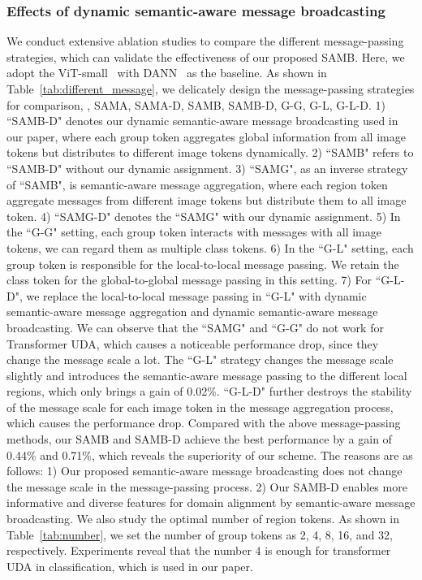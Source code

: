 \documentclass[journal]{IEEEtran}
\begin{document}
\subsubsection{Effects of dynamic semantic-aware message broadcasting}
\label{sec:ab_ms}
We conduct extensive ablation studies to compare the different message-passing strategies, which can validate the effectiveness of our proposed SAMB. Here, we adopt the ViT-small~\cite{dosovitskiy2020imageViT} with DANN~\cite{ganin2016domain_dann} as the baseline. As shown in Table~\ref{tab:different_message}, we
delicately design the  message-passing strategies for comparison, \ieno, SAMA, SAMA-D, SAMB, SAMB-D, G-G, G-L, G-L-D. 1) ``SAMB-D" denotes our dynamic semantic-aware message broadcasting used in our paper, where each group token aggregates global information from all image tokens but distributes to different image tokens dynamically. 2) ``SAMB" refers to ``SAMB-D" without our dynamic assignment. 3) ``SAMG", as an inverse strategy of ``SAMB", is semantic-aware message aggregation, where each region token aggregate messages from different image tokens but distribute them to all image token. 4) ``SAMG-D" denotes the ``SAMG" with our dynamic assignment. 
5) In the ``G-G" setting, each group token interacts with messages with all image tokens, we can regard them as multiple class tokens. 6) In the ``G-L" setting, each group token is responsible for the local-to-local message passing. We retain the class token for the global-to-global message passing in this setting. 7) For ``G-L-D", we replace the local-to-local message passing in ``G-L" with dynamic semantic-aware message aggregation and dynamic semantic-aware message broadcasting. 
We can observe that the ``SAMG" and  ``G-G" do not work for Transformer UDA, which causes a noticeable performance drop, since they change the message scale a lot. The ``G-L" strategy changes the message scale slightly and introduces the semantic-aware message passing to the different local regions, which only brings a gain of 0.02\%. ``G-L-D" further destroys the stability of the message scale for each image token in the message aggregation process, which causes the performance drop. Compared with the above message-passing methods, our SAMB and SAMB-D achieve the best performance by a gain of 0.44\% and 0.71\%, which reveals the superiority of our scheme. The reasons are as follows: 1) Our proposed semantic-aware message broadcasting does not change the message scale in the message-passing process. 2) Our SAMB-D enables more informative and diverse features for domain alignment by semantic-aware message broadcasting.  
We also study the optimal number of region tokens. As shown in Table~\ref{tab:number}, we set the number of group tokens as 2, 4, 8, 16, and 32, respectively. Experiments reveal that the number $4$ is enough for transformer UDA in classification, which is used in our paper. 
\end{document}
